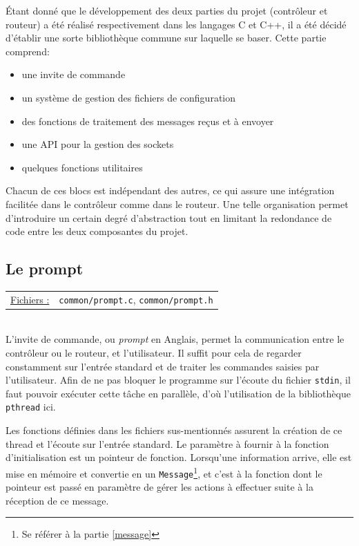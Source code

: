 \documentclass[a4paper,11pt]{article}
\begin{document}
Étant donné que le développement des deux parties du projet (contrôleur et routeur) a été réalisé respectivement dans les langages C et C++, il a été décidé d'établir une sorte bibliothèque commune sur laquelle se baser. Cette partie comprend:
\begin{itemize}
 \item une invite de commande
 \item un système de gestion des fichiers de configuration
 \item des fonctions de traitement des messages reçus et à envoyer
 \item une API pour la gestion des sockets
 \item quelques fonctions utilitaires
\end{itemize}

Chacun de ces blocs est indépendant des autres, ce qui assure une intégration facilitée dans le contrôleur comme dans le routeur. Une telle organisation permet d'introduire un certain degré d'abstraction tout en limitant la redondance
de code entre les deux composantes du projet.

\subsection{Le prompt}

\begin{tabularx}{\linewidth}{lX}
\underline{Fichiers :} & \texttt{common/prompt.c}, \texttt{common/prompt.h}
\end{tabularx}\\

L'invite de commande, ou \textit{prompt} en Anglais, permet la communication entre le contrôleur ou le routeur, et l'utilisateur. Il suffit pour cela de regarder constamment sur l'entrée standard et de traiter les commandes saisies par l'utilisateur. Afin de ne pas bloquer le programme sur l'écoute du fichier \texttt{stdin}, il faut pouvoir exécuter cette tâche en parallèle, d'où l'utilisation de la bibliothèque \texttt{pthread} ici.

Les fonctions définies dans les fichiers sus-mentionnés assurent la création de ce thread et l'écoute sur l'entrée standard. Le paramètre à fournir à la fonction d'initialisation est un pointeur de fonction. Lorsqu'une information arrive, elle est mise en mémoire et convertie en un \texttt{Message}\footnote{Se référer à la partie \ref{message}}, et c'est à la fonction dont le pointeur est passé en paramètre de gérer les actions à effectuer suite à la réception de ce message.
\end{document}
